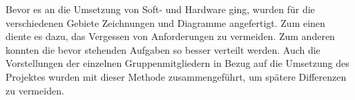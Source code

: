 \label{Entwurf}

Bevor es an die Umsetzung von Soft- und Hardware ging, wurden für die verschiedenen Gebiete Zeichnungen und Diagramme angefertigt. Zum einen diente es dazu, das Vergessen von Anforderungen zu vermeiden. Zum anderen konnten die bevor stehenden Aufgaben so besser verteilt werden. Auch die Vorstellungen der einzelnen Gruppenmitgliedern in Bezug auf die Umsetzung des Projektes wurden mit dieser Methode zusammengeführt, um spätere Differenzen zu vermeiden. \\